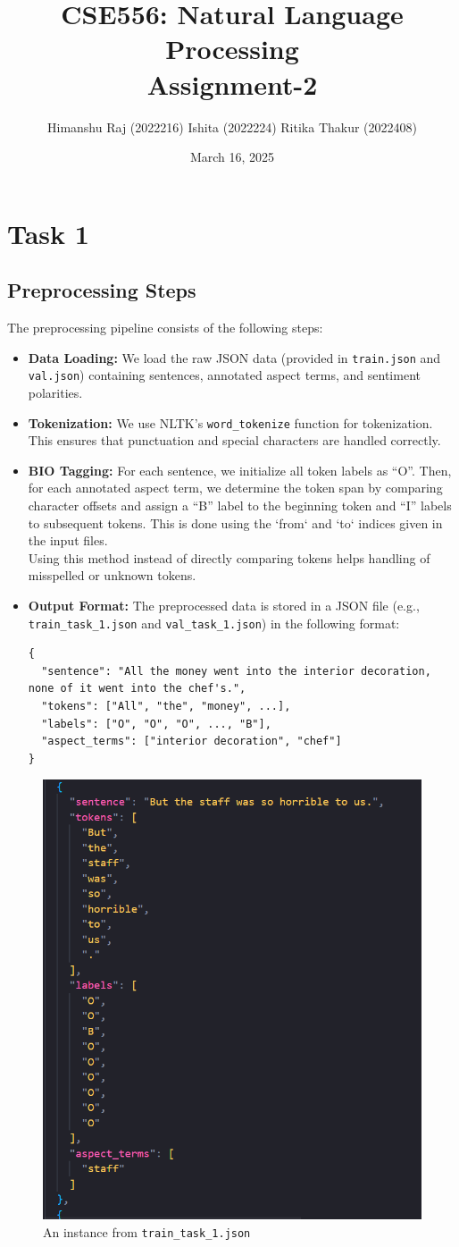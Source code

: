 \documentclass{article}
\title{CSE556: Natural Language Processing \\ Assignment-2}
\author{Himanshu Raj (2022216) \textbar{} Ishita (2022224) \textbar{} Ritika Thakur (2022408) }
\date{March 16, 2025}
\begin{document}
\maketitle

\section{Task 1}
\subsection{Preprocessing Steps}
The preprocessing pipeline consists of the following steps:
\begin{itemize}
    \item \textbf{Data Loading:} We load the raw JSON data (provided in \texttt{train.json} and \texttt{val.json}) containing sentences, annotated aspect terms, and sentiment polarities.
    \item \textbf{Tokenization:} We use NLTK's \texttt{word\_tokenize} function for tokenization. This ensures that punctuation and special characters are handled correctly.
    \item \textbf{BIO Tagging:} For each sentence, we initialize all token labels as ``O''. Then, for each annotated aspect term, we determine the token span by comparing character offsets and assign a ``B'' label to the beginning token and ``I'' labels to subsequent tokens. This is done using the `from` and `to` indices given in the input files.\\
    Using this method instead of directly comparing tokens helps handling of misspelled or unknown tokens.
    \item \textbf{Output Format:} The preprocessed data is stored in a JSON file (e.g., \texttt{train\_task\_1.json} and \texttt{val\_task\_1.json}) in the following format:
    \begin{verbatim}
{
  "sentence": "All the money went into the interior decoration, none of it went into the chef's.",
  "tokens": ["All", "the", "money", ...],
  "labels": ["O", "O", "O", ..., "B"],
  "aspect_terms": ["interior decoration", "chef"]
}
    \end{verbatim}
\end{itemize}

\begin{figure}[H]
    \centering
    \includegraphics[width=0.5\linewidth]{image5.png}
    \caption{An instance from \texttt{train\_task\_1.json}}
\end{figure}
\end{document}
